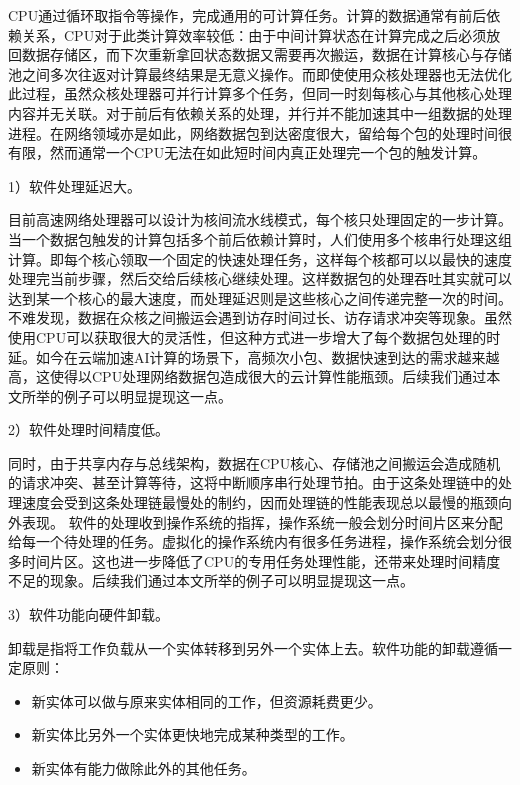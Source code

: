 

CPU通过循环取指令等操作，完成通用的可计算任务。计算的数据通常有前后依赖关系，CPU对于此类计算效率较低：由于中间计算状态在计算完成之后必须放回数据存储区，而下次重新拿回状态数据又需要再次搬运，数据在计算核心与存储池之间多次往返对计算最终结果是无意义操作。而即使使用众核处理器也无法优化此过程，虽然众核处理器可并行计算多个任务，但同一时刻每核心与其他核心处理内容并无关联。对于前后有依赖关系的处理，并行并不能加速其中一组数据的处理进程。在网络领域亦是如此，网络数据包到达密度很大，留给每个包的处理时间很有限，然而通常一个CPU无法在如此短时间内真正处理完一个包的触发计算。


1）软件处理延迟大。

目前高速网络处理器可以设计为核间流水线模式，每个核只处理固定的一步计算。当一个数据包触发的计算包括多个前后依赖计算时，人们使用多个核串行处理这组计算。即每个核心领取一个固定的快速处理任务，这样每个核都可以以最快的速度处理完当前步骤，然后交给后续核心继续处理。这样数据包的处理吞吐其实就可以达到某一个核心的最大速度，而处理延迟则是这些核心之间传递完整一次的时间。不难发现，数据在众核之间搬运会遇到访存时间过长、访存请求冲突等现象。虽然使用CPU可以获取很大的灵活性，但这种方式进一步增大了每个数据包处理的时延。如今在云端加速AI计算的场景下，高频次小包、数据快速到达的需求越来越高，这使得以CPU处理网络数据包造成很大的云计算性能瓶颈。后续我们通过本文所举的例子可以明显提现这一点。

2）软件处理时间精度低。

同时，由于共享内存与总线架构，数据在CPU核心、存储池之间搬运会造成随机的请求冲突、甚至计算等待，这将中断顺序串行处理节拍。由于这条处理链中的处理速度会受到这条处理链最慢处的制约，因而处理链的性能表现总以最慢的瓶颈向外表现。
软件的处理收到操作系统的指挥，操作系统一般会划分时间片区来分配给每一个待处理的任务。虚拟化的操作系统内有很多任务进程，操作系统会划分很多时间片区。这也进一步降低了CPU的专用任务处理性能，还带来处理时间精度不足的现象。后续我们通过本文所举的例子可以明显提现这一点。

3）软件功能向硬件卸载。

卸载是指将工作负载从一个实体转移到另外一个实体上去。软件功能的卸载遵循一定原则：

\begin{itemize}
	\item 新实体可以做与原来实体相同的工作，但资源耗费更少。
	\item 新实体比另外一个实体更快地完成某种类型的工作。
	\item 新实体有能力做除此外的其他任务。
\end{itemize}

